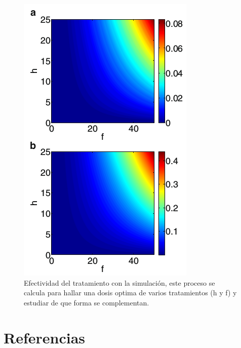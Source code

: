 \documentclass[1p]{elsarticle}
\begin{document}
	\begin{figure}
		\begin{center}
		
		\includegraphics[scale=0.7]{sexta.png}
		\caption{Efectividad del tratamiento con la simulación, este proceso se calcula para hallar una dosis optima de varios tratamientos (h y f) y estudiar de que forma se complementan.}
		\label{cerebro15}
		
		\end{center}
	\end{figure}










\section*{Referencias}


\end{document}
